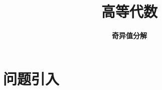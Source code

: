 



\title[高等代数]{\LARGE \bfseries 高等代数} %
\author[SVD] %
{\Large \bfseries 奇异值分解}
\date{}






\begin{frame}

\titlepage %

\end{frame}





\section{问题引入}

